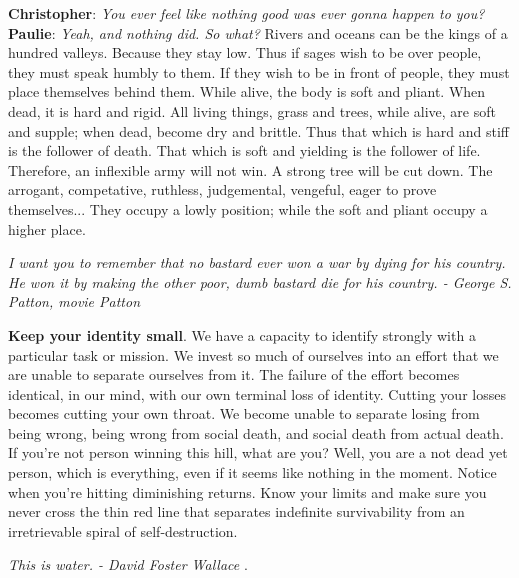 \documentclass[a4paper,hidelinks]{article}
\begin{document}
\newpage

{\setlength\parindent{0pt}
\textbf{Christopher}: \textit{You ever feel like nothing good was ever gonna happen to you?}
\textbf{Paulie}: \textit{Yeah, and nothing did. So what?}
}
\newline
\newline
Rivers and oceans can be the kings of a hundred valleys.
Because they stay low.
Thus if sages wish to be over people, they must speak humbly to them.
If they wish to be in front of people, they must place themselves behind them.
While alive, the body is soft and pliant.
When dead, it is hard and rigid.
All living things, grass and trees, while alive, are soft and supple; when dead, become dry and brittle.
Thus that which is hard and stiff is the follower of death.
That which is soft and yielding is the follower of life.
Therefore, an inflexible army will not win.
A strong tree will be cut down.
The arrogant, competative, ruthless, judgemental, vengeful, eager to prove themselves...
They occupy a lowly position; while the soft and pliant occupy a higher place.

\newpage

\begin{center}
\textit{
I want you to remember that no bastard ever won a war by dying for his country. He won it by making the other poor, dumb bastard die for his country. - George S. Patton, movie Patton
}
\end{center}

\textbf{Keep your identity small}.
We have a capacity to identify strongly with a particular task or mission.
We invest so much of ourselves into an effort that we are unable to separate ourselves from it.
The failure of the effort becomes identical, in our mind, with our own terminal loss of identity.
Cutting your losses becomes cutting your own throat.
We become unable to separate losing from being wrong, being wrong from social death, and social death from actual death.
If you're not person winning this hill, what are you? Well, you are a not dead yet person, which is everything, even if it seems like nothing in the moment.
Notice when you're hitting diminishing returns.
Know your limits and make sure you never cross the thin red line that separates indefinite survivability from an irretrievable spiral of self-destruction.

\newpage

\begin{center}
\textit{
This is water. - David Foster Wallace
}.
\end{center}
\end{document}
